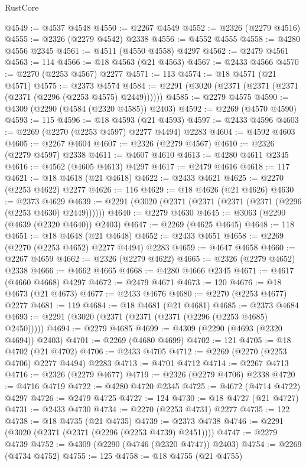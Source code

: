 \begin{lexlean}{RustCore}
\begin{coremodule}
@4549 := @4537 @4548
@4550 := @2267 @4549
@4552 := @2326 (@2279 @4516)
@4555 := @2326 (@2279 @4542) @2338
@4556 := @4552 @4555
@4558 := @4280 @4556 @2345
@4561 := @4511 (@4550 @4558) @4297
@4562 := @2479 @4561
@4563 := 114
@4566 := @18 @4563 (@21 @4563)
@4567 := @2433 @4566
@4570 := @2270 (@2253 @4567) @2277
@4571 := 113
@4574 := @18 @4571 (@21 @4571)
@4575 := @2373 @4574
@4584 := @2291 (@3020 (@2371 (@2371 (@2371 (@2371 (@2296 (@2253 @4575) @2449))))))
@4585 := @2279 @4575
@4590 := @4309 (@2290 (@4584 (@2320 @4585)) @2403)
@4592 := @2269 (@4570 @4590)
@4593 := 115
@4596 := @18 @4593 (@21 @4593)
@4597 := @2433 @4596
@4603 := @2269 (@2270 (@2253 @4597) @2277 @4494) @2283
@4604 := @4592 @4603
@4605 := @2267 @4604
@4607 := @2326 (@2279 @4567)
@4610 := @2326 (@2279 @4597) @2338
@4611 := @4607 @4610
@4613 := @4280 @4611 @2345
@4616 := @4562 (@4605 @4613) @4297
@4617 := @2479 @4616
@4618 := 117
@4621 := @18 @4618 (@21 @4618)
@4622 := @2433 @4621
@4625 := @2270 (@2253 @4622) @2277
@4626 := 116
@4629 := @18 @4626 (@21 @4626)
@4630 := @2373 @4629
@4639 := @2291 (@3020 (@2371 (@2371 (@2371 (@2371 (@2296 (@2253 @4630) @2449))))))
@4640 := @2279 @4630
@4645 := @3063 (@2290 (@4639 (@2320 @4640)) @2403)
@4647 := @2269 (@4625 @4645)
@4648 := 118
@4651 := @18 @4648 (@21 @4648)
@4652 := @2433 @4651
@4658 := @2269 (@2270 (@2253 @4652) @2277 @4494) @2283
@4659 := @4647 @4658
@4660 := @2267 @4659
@4662 := @2326 (@2279 @4622)
@4665 := @2326 (@2279 @4652) @2338
@4666 := @4662 @4665
@4668 := @4280 @4666 @2345
@4671 := @4617 (@4660 @4668) @4297
@4672 := @2479 @4671
@4673 := 120
@4676 := @18 @4673 (@21 @4673)
@4677 := @2433 @4676
@4680 := @2270 (@2253 @4677) @2277
@4681 := 119
@4684 := @18 @4681 (@21 @4681)
@4685 := @2373 @4684
@4693 := @2291 (@3020 (@2371 (@2371 (@2371 (@2296 (@2253 @4685) @2450)))))
@4694 := @2279 @4685
@4699 := @4309 (@2290 (@4693 (@2320 @4694)) @2403)
@4701 := @2269 (@4680 @4699)
@4702 := 121
@4705 := @18 @4702 (@21 @4702)
@4706 := @2433 @4705
@4712 := @2269 (@2270 (@2253 @4706) @2277 @4494) @2283
@4713 := @4701 @4712
@4714 := @2267 @4713
@4716 := @2326 (@2279 @4677)
@4719 := @2326 (@2279 @4706) @2338
@4720 := @4716 @4719
@4722 := @4280 @4720 @2345
@4725 := @4672 (@4714 @4722) @4297
@4726 := @2479 @4725
@4727 := 124
@4730 := @18 @4727 (@21 @4727)
@4731 := @2433 @4730
@4734 := @2270 (@2253 @4731) @2277
@4735 := 122
@4738 := @18 @4735 (@21 @4735)
@4739 := @2373 @4738
@4746 := @2291 (@3020 (@2371 (@2371 (@2296 (@2253 @4739) @2451))))
@4747 := @2279 @4739
@4752 := @4309 (@2290 (@4746 (@2320 @4747)) @2403)
@4754 := @2269 (@4734 @4752)
@4755 := 125
@4758 := @18 @4755 (@21 @4755)

\end{coremodule}
\end{lexlean}
